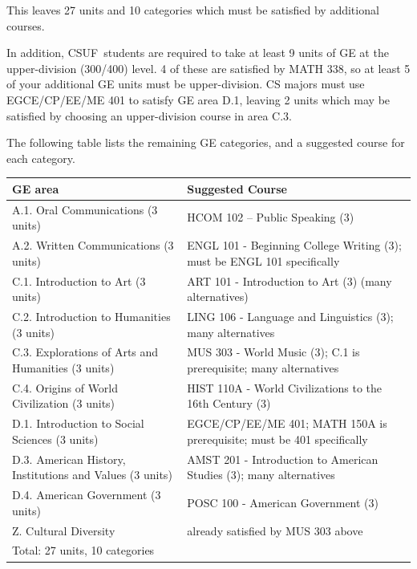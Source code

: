 \documentclass{book}
\newcommand{\CampusName}{CSUF}
\begin{document}
This leaves 27 units and 10 categories which must be satisfied by additional courses.

In addition, \CampusName~students are required to take at least 9 units of GE at the upper-division (300/400) level. 4 of these are satisfied by MATH 338, so at least 5 of your additional GE units must be upper-division. CS majors must use EGCE/CP/EE/ME 401 to satisfy GE area D.1, leaving 2 units which may be satisfied by choosing an upper-division course in area C.3.

The following table lists the remaining GE categories, and a suggested course for each category.

\begin{center}
\begin{tabular}{| p{3in} | p{3in} |} \hline
  \textbf{GE area} & \textbf{Suggested Course} \\ \hline
  A.1. Oral Communications (3 units) & HCOM 102 – Public Speaking (3) \\ \hline
  A.2. Written Communications (3 units) & ENGL 101 - Beginning College Writing (3); must be ENGL 101 specifically \\ \hline
  C.1. Introduction to Art (3 units) & ART 101 - Introduction to Art (3) (many alternatives) \\ \hline
  C.2. Introduction to Humanities (3 units) & LING 106 - Language and Linguistics (3); many alternatives \\ \hline
  C.3. Explorations of Arts and Humanities (3 units) & MUS 303 - World Music (3); C.1 is prerequisite; many alternatives \\ \hline
  C.4. Origins of World Civilization (3 units) & HIST 110A - World Civilizations to the 16th Century (3) \\ \hline
  D.1. Introduction to Social Sciences (3 units) & EGCE/CP/EE/ME 401; MATH 150A is prerequisite; must be 401 specifically \\ \hline
  D.3. American History, Institutions and Values (3 units) & AMST 201 - Introduction to American Studies (3); many alternatives \\ \hline
  D.4. American Government (3 units) & POSC 100 - American Government (3) \\ \hline
  Z. Cultural Diversity & already satisfied by MUS 303 above \\ \hline
  \multicolumn{2}{|l|}{Total: 27 units, 10 categories} \\ \hline
\end{tabular}
\end{center}
\end{document}
